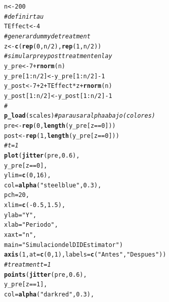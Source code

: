 \documentclass[onesided]{article}\usepackage[]{graphicx}\usepackage[]{color}
\makeatletter
\newcommand{\hlnum}[1]{\textcolor[rgb]{0.686,0.059,0.569}{#1}}%
\newcommand{\hlstr}[1]{\textcolor[rgb]{0.192,0.494,0.8}{#1}}%
\newcommand{\hlcom}[1]{\textcolor[rgb]{0.678,0.584,0.686}{\textit{#1}}}%
\newcommand{\hlopt}[1]{\textcolor[rgb]{0,0,0}{#1}}%
\newcommand{\hlstd}[1]{\textcolor[rgb]{0.345,0.345,0.345}{#1}}%
\newcommand{\hlkwb}[1]{\textcolor[rgb]{0.69,0.353,0.396}{#1}}%
\newcommand{\hlkwc}[1]{\textcolor[rgb]{0.333,0.667,0.333}{#1}}%
\newcommand{\hlkwd}[1]{\textcolor[rgb]{0.737,0.353,0.396}{\textbf{#1}}}%
\newenvironment{kframe}{%
 \def\at@end@of@kframe{}%
 \ifinner\ifhmode%
  \def\at@end@of@kframe{\end{minipage}}%
  \begin{minipage}{\columnwidth}%
 \fi\fi%
 \def\FrameCommand##1{\hskip\@totalleftmargin \hskip-\fboxsep
 \colorbox{shadecolor}{##1}\hskip-\fboxsep
     \hskip-\linewidth \hskip-\@totalleftmargin \hskip\columnwidth}%
 \MakeFramed {\advance\hsize-\width
   \@totalleftmargin\z@ \linewidth\hsize
   \@setminipage}}%
 {\par\unskip\endMakeFramed%
 \at@end@of@kframe}
\newenvironment{knitrout}{}{} %
\makeatother
\begin{document}
\begin{knitrout}
\color{fgcolor}\begin{kframe}
\begin{alltt}
\hlstd{n} \hlkwb{<-} \hlnum{200}
\hlcom{# definir tau}
\hlstd{TEffect} \hlkwb{<-} \hlnum{4}
\hlcom{# generar dummy de treatment }
\hlstd{z} \hlkwb{<-} \hlkwd{c}\hlstd{(}\hlkwd{rep}\hlstd{(}\hlnum{0}\hlstd{, n}\hlopt{/}\hlnum{2}\hlstd{),} \hlkwd{rep}\hlstd{(}\hlnum{1}\hlstd{, n}\hlopt{/}\hlnum{2}\hlstd{))}
\hlcom{# simular pre y post treatment en la y}
\hlstd{y_pre} \hlkwb{<-} \hlnum{7} \hlopt{+} \hlkwd{rnorm}\hlstd{(n)}
\hlstd{y_pre[}\hlnum{1}\hlopt{:}\hlstd{n}\hlopt{/}\hlnum{2}\hlstd{]} \hlkwb{<-} \hlstd{y_pre[}\hlnum{1}\hlopt{:}\hlstd{n}\hlopt{/}\hlnum{2}\hlstd{]} \hlopt{-} \hlnum{1}
\hlstd{y_post} \hlkwb{<-} \hlnum{7} \hlopt{+} \hlnum{2} \hlopt{+} \hlstd{TEffect} \hlopt{*} \hlstd{z} \hlopt{+} \hlkwd{rnorm}\hlstd{(n)}
\hlstd{y_post[}\hlnum{1}\hlopt{:}\hlstd{n}\hlopt{/}\hlnum{2}\hlstd{]} \hlkwb{<-} \hlstd{y_post[}\hlnum{1}\hlopt{:}\hlstd{n}\hlopt{/}\hlnum{2}\hlstd{]} \hlopt{-} \hlnum{1}
\hlcom{#}
\hlkwd{p_load}\hlstd{(scales)} \hlcom{# para usar alpha abajo (colores)}
\hlstd{pre} \hlkwb{<-} \hlkwd{rep}\hlstd{(}\hlnum{0}\hlstd{,} \hlkwd{length}\hlstd{(y_pre[z}\hlopt{==}\hlnum{0}\hlstd{]))}
\hlstd{post} \hlkwb{<-} \hlkwd{rep}\hlstd{(}\hlnum{1}\hlstd{,} \hlkwd{length}\hlstd{(y_pre[z}\hlopt{==}\hlnum{0}\hlstd{]))}
\hlcom{# t=1}
\hlkwd{plot}\hlstd{(}\hlkwd{jitter}\hlstd{(pre,} \hlnum{0.6}\hlstd{),}
     \hlstd{y_pre[z} \hlopt{==} \hlnum{0}\hlstd{],}
     \hlkwc{ylim} \hlstd{=} \hlkwd{c}\hlstd{(}\hlnum{0}\hlstd{,} \hlnum{16}\hlstd{),}
     \hlkwc{col} \hlstd{=} \hlkwd{alpha}\hlstd{(}\hlstr{"steelblue"}\hlstd{,} \hlnum{0.3}\hlstd{),}
     \hlkwc{pch} \hlstd{=} \hlnum{20}\hlstd{,}
     \hlkwc{xlim} \hlstd{=} \hlkwd{c}\hlstd{(}\hlopt{-}\hlnum{0.5}\hlstd{,} \hlnum{1.5}\hlstd{),}
     \hlkwc{ylab} \hlstd{=} \hlstr{"Y"}\hlstd{,}
     \hlkwc{xlab} \hlstd{=} \hlstr{"Periodo"}\hlstd{,}
     \hlkwc{xaxt} \hlstd{=} \hlstr{"n"}\hlstd{,}
     \hlkwc{main} \hlstd{=} \hlstr{"Simulacion del DID Estimator"}\hlstd{)}
\hlkwd{axis}\hlstd{(}\hlnum{1}\hlstd{,} \hlkwc{at} \hlstd{=} \hlkwd{c}\hlstd{(}\hlnum{0}\hlstd{,} \hlnum{1}\hlstd{),} \hlkwc{labels} \hlstd{=} \hlkwd{c}\hlstd{(}\hlstr{"Antes"}\hlstd{,} \hlstr{"Despues"}\hlstd{))}
\hlcom{# treatment t=1}
\hlkwd{points}\hlstd{(}\hlkwd{jitter}\hlstd{(pre,} \hlnum{0.6}\hlstd{),}
       \hlstd{y_pre[z} \hlopt{==} \hlnum{1}\hlstd{],}
       \hlkwc{col} \hlstd{=} \hlkwd{alpha}\hlstd{(}\hlstr{"darkred"}\hlstd{,} \hlnum{0.3}\hlstd{),}

\end{alltt}
\end{kframe}
\end{knitrout}
\end{document}
